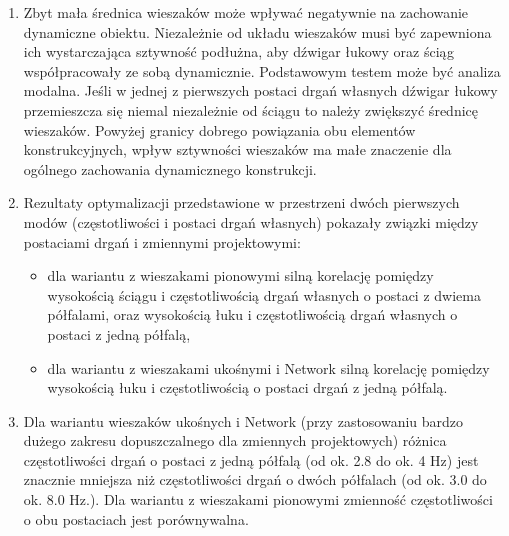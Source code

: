 \begin{enumerate}
\item Zbyt mała średnica wieszaków może wpływać negatywnie na zachowanie dynamiczne obiektu. Niezależnie od układu wieszaków musi być zapewniona ich wystarczająca sztywność podłużna, aby dźwigar łukowy oraz ściąg współpracowały ze sobą dynamicznie. Podstawowym testem może być analiza modalna. Jeśli w jednej z pierwszych postaci drgań własnych dźwigar łukowy przemieszcza się niemal niezależnie od ściągu to należy zwiększyć średnicę wieszaków. Powyżej granicy dobrego powiązania obu elementów konstrukcyjnych, wpływ sztywności wieszaków ma małe znaczenie dla ogólnego zachowania dynamicznego konstrukcji.

\item Rezultaty optymalizacji przedstawione w przestrzeni dwóch pierwszych modów (częstotliwości i postaci drgań własnych) pokazały związki między postaciami drgań i zmiennymi projektowymi:
\begin{itemize} 
	\item dla wariantu z wieszakami pionowymi silną korelację pomiędzy wysokością ściągu i częstotliwością drgań własnych o postaci z dwiema półfalami, oraz wysokością łuku i częstotliwością drgań własnych o postaci z jedną półfalą,
	\item dla wariantu z wieszakami ukośnymi i Network silną korelację pomiędzy wysokością łuku i częstotliwością o postaci drgań z jedną półfalą.
\end{itemize}

\item Dla wariantu wieszaków ukośnych i Network (przy zastosowaniu bardzo dużego zakresu dopuszczalnego dla zmiennych projektowych) różnica częstotliwości drgań o postaci z jedną półfalą (od ok. 2.8 do ok. 4 Hz) jest znacznie mniejsza niż częstotliwości drgań o dwóch półfalach (od ok. 3.0 do ok. 8.0 Hz.). Dla wariantu z wieszakami pionowymi zmienność częstotliwości o obu postaciach jest porównywalna.


\end{enumerate}
